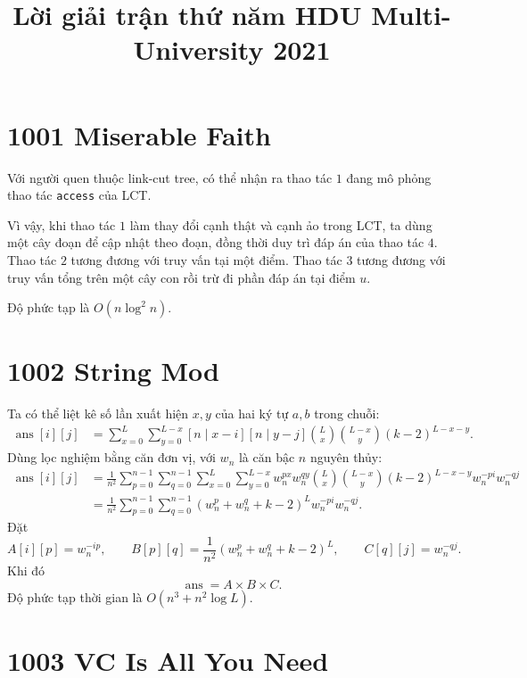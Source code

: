 \documentclass[11pt]{article}
\title{Lời giải trận thứ năm HDU Multi-University 2021}
\author{}
\date{}
\begin{document}
\maketitle


\section{1001 Miserable Faith}

Với người quen thuộc link-cut tree, có thể nhận ra thao tác $1$ đang mô phỏng
thao tác \texttt{access} của LCT.

Vì vậy, khi thao tác $1$ làm thay đổi cạnh thật và cạnh ảo trong LCT, ta dùng
một cây đoạn để cập nhật theo đoạn, đồng thời duy trì đáp án của thao tác
$4$. Thao tác $2$ tương đương với truy vấn tại một điểm. Thao tác $3$ tương
đương với truy vấn tổng trên một cây con rồi trừ đi phần đáp án tại điểm
$u$.

Độ phức tạp là $O(n\log^2 n)$.

\section{1002 String Mod}

Ta có thể liệt kê số lần xuất hiện $x,y$ của hai ký tự $a,b$ trong chuỗi:
\[
\begin{aligned}
  \operatorname{ans}[i][j]
  &=
  \sum_{x=0}^{L}\sum_{y=0}^{L-x}
  [n\mid x-i][n\mid y-j]
  \binom{L}{x}\binom{L-x}{y}(k-2)^{L-x-y}.
\end{aligned}
\]
Dùng lọc nghiệm bằng căn đơn vị, với $w_n$ là căn bậc $n$ nguyên thủy:
\[
\begin{aligned}
  \operatorname{ans}[i][j]
  &=
  \frac1{n^2}
  \sum_{p=0}^{n-1}\sum_{q=0}^{n-1}
  \sum_{x=0}^{L}\sum_{y=0}^{L-x}
  w_n^{px}w_n^{qy}
  \binom{L}{x}\binom{L-x}{y}
  (k-2)^{L-x-y}
  w_n^{-pi}w_n^{-qj}  \\
  &=
  \frac1{n^2}
  \sum_{p=0}^{n-1}\sum_{q=0}^{n-1}
  (w_n^p+w_n^q+k-2)^Lw_n^{-pi}w_n^{-qj}.
\end{aligned}
\]
Đặt
\[
  A[i][p]=w_n^{-ip},\qquad
  B[p][q]=\frac1{n^2}(w_n^p+w_n^q+k-2)^L,\qquad
  C[q][j]=w_n^{-qj}.
\]
Khi đó
\[
  \operatorname{ans}=A\times B\times C.
\]
Độ phức tạp thời gian là $O(n^3+n^2\log L)$.

\section{1003 VC Is All You Need}
\end{document}

